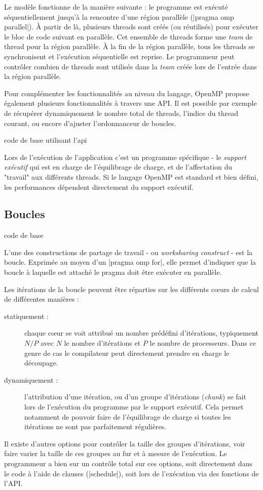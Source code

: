 Le modèle fonctionne de la manière suivante : le programme est exécuté séquentiellement jusqu'à la rencontre d'une région parallèle (|pragma omp parallel|).
À partir de là, plusieurs threads sont créés (ou réutilisés) pour exécuter le bloc de code suivant en parallèle.
Cet ensemble de threads forme une \emph{team} de thread pour la région parallèle.
À la fin de la région parallèle, tous les threads se synchronisent et l'exécution séquentielle est reprise.
Le programmeur peut contrôler combien de threads sont utilisés dans la \emph{team} créée lors de l'entrée dans la région parallèle.

Pour complémenter les fonctionnalités au niveau du langage, OpenMP propose également plusieurs fonctionnalités à travers une API.
Il est possible par exemple de récupérer dynamiquement le nombre total de threads, l'indice du thread courant, ou encore d'ajuster l'ordonnanceur de boucles.
\begin{todo}
  code de base utilisant l'api
\end{todo}

Lors de l'exécution de l'application c'est un programme spécifique - le \emph{support exécutif} qui est en charge de l'équilibrage de charge, et de l'affectation du "travail" aux différents threads.
Si le langage OpenMP est standard et bien défini, les performances dépendent directement du support exécutif.



\subsection{Boucles}

\begin{todo}
  code de base
\end{todo}

L'une des constructions de partage de travail - ou \emph{worksharing construct} - est la boucle.
Exprimée au moyen d'un |pragma omp for|, elle permet d'indiquer que la boucle à laquelle est attaché le pragma doit être exécuter en parallèle.

Les itérations de la boucle peuvent être réparties sur les différents cœurs de calcul de différentes manières :
\begin{description}
  \item [statiquement :] chaque cœur se voit attribué un nombre prédéfini d'itérations, typiquement $N/P$ avec $N$ le nombre d'itérations et $P$ le nombre de processeurs. Dans ce genre de cas le compilateur peut directement prendre en charge le découpage.
  \item [dynamiquement :] l'attribution d'une itération, ou d'un groupe d'itérations (\emph{chunk}) se fait lors de l'exécution du programme par le support exécutif. Cela permet notamment de pouvoir faire de l'équilibrage de charge si toutes les itérations ne sont pas parfaitement régulières.
\end{description}
Il existe d'autres options pour contrôler la taille des groupes d'itérations, voir faire varier la taille de ces groupes au fur et à mesure de l'exécution.
Le programmeur a bien sur un contrôle total sur ces options, soit directement dans le code à l'aide de clauses (|schedule|), soit lors de l'exécution via des fonctions de l'API.

